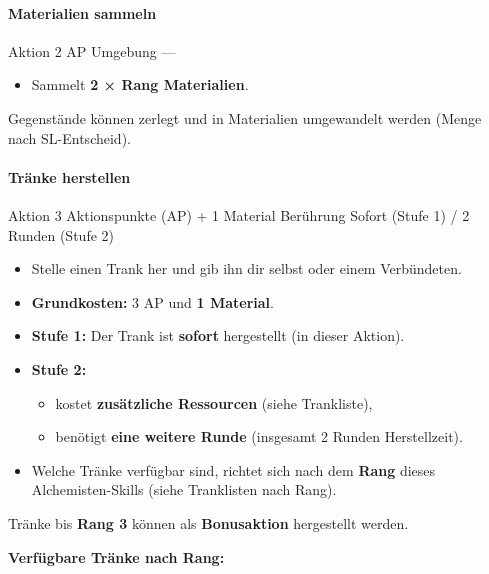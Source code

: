 \paragraph*{Materialien sammeln}

\skillcard
{}
{Aktion}
{2 AP}
{Umgebung}
{—}
{
	\begin{itemize}
		\item Sammelt \textbf{2 × Rang Materialien}.
	\end{itemize}
}
{
	Gegenstände können zerlegt und in Materialien umgewandelt werden
	(Menge nach SL-Entscheid).
}

\paragraph*{Tränke herstellen}

\skillcard
{}
{Aktion}
{3 Aktionspunkte (AP) + 1 Material}
{Berührung}
{Sofort (Stufe 1) / 2 Runden (Stufe 2)}
{
	\begin{itemize}
		\item Stelle einen Trank her und gib ihn dir selbst oder einem Verbündeten.
		\item \textbf{Grundkosten:} 3 AP und \textbf{1 Material}.
		\item \textbf{Stufe 1:} Der Trank ist \textbf{sofort} hergestellt (in dieser Aktion).
		\item \textbf{Stufe 2:}
		\begin{itemize}
			\item kostet \textbf{zusätzliche Ressourcen} (siehe Trankliste),
			\item benötigt \textbf{eine weitere Runde} (insgesamt 2 Runden Herstellzeit).
		\end{itemize}
		\item Welche Tränke verfügbar sind, richtet sich nach dem \textbf{Rang} dieses Alchemisten-Skills
		(siehe Tranklisten nach Rang).
	\end{itemize}
}
{
	Tränke bis \textbf{Rang 3} können als \textbf{Bonusaktion} hergestellt werden.
}

\medspace

\textbf{Verfügbare Tränke nach Rang:}

